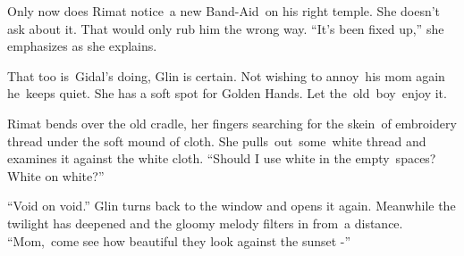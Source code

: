 \documentclass[letterpaper]{article}
\begin{document}
\textcolor[rgb]{0.13333334,0.13333334,0.13333334}{Only now does Rimat notice~a new
B}and-Aid\ \textcolor[rgb]{0.13333334,0.13333334,0.13333334}{on his right temple. She doesn't ask about it. T}hat would
only rub him the wrong way\textcolor[rgb]{0.13333334,0.13333334,0.13333334}{. ``It's been fixed up,{}'' she emphasizes
as she explains. }\ 

\textcolor[rgb]{0.13333334,0.13333334,0.13333334}{That too is\ Gidal's doing, Glin is certain. Not wishing to annoy\ his
}mom\textcolor[rgb]{0.13333334,0.13333334,0.13333334}{ again he\ keeps quiet. She has a soft spot for Golden Hands. Let
the\ }old\ boy\ \textcolor[rgb]{0.13333334,0.13333334,0.13333334}{enjoy it.}\ 

\textcolor[rgb]{0.13333334,0.13333334,0.13333334}{Rimat bends over the old cradle, her fingers searching for the
}skein\ \textcolor[rgb]{0.13333334,0.13333334,0.13333334}{of embroidery thread under the soft mound of cloth. She
pulls\ }out\ some\ \textcolor[rgb]{0.13333334,0.13333334,0.13333334}{white thread and examines it against the white
cloth. ``Should I use white in the }empty\textcolor[rgb]{0.13333334,0.13333334,0.13333334}{\ spaces? White on white?''}

\textcolor[rgb]{0.13333334,0.13333334,0.13333334}{{}``Void on void.{}'' Glin
}turns\textcolor[rgb]{0.13333334,0.13333334,0.13333334}{ back to the window and opens it again. Meanwhile the twilight
has deepened and the gloomy melody filters in from~a distance. ``Mom,\ come see how beautiful they look against the
sunset -{}''}\ 
\end{document}

